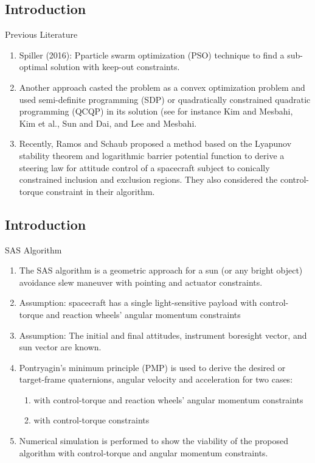 \documentclass{beamer}
\begin{document}
\begin{frame}
	\section{Introduction}
		\begin{block}{Previous Literature}
			\begin{enumerate}
				\item Spiller (2016): Pparticle swarm optimization (PSO) technique to find a sub-optimal solution with keep-out constraints. 
				\item Another approach casted the problem as a convex optimization problem and used semi-definite programming (SDP) or quadratically constrained quadratic programming (QCQP) in its solution (see for instance Kim and Mesbahi, Kim et al., Sun and Dai, and Lee and Mesbahi.
				\item Recently, Ramos and Schaub proposed a method based on the Lyapunov stability theorem and logarithmic barrier potential function to derive a steering law for attitude control of a spacecraft subject to conically constrained inclusion and exclusion regions. They also considered the control-torque constraint in their algorithm.  
		\end{enumerate}
	\end{block}
\end{frame}
\begin{frame}
\section{Introduction}
\begin{block}{SAS Algorithm}
	\begin{enumerate} 
		\item The SAS algorithm is a geometric approach for a sun (or any bright object) avoidance slew maneuver with pointing and actuator constraints. 
		\item Assumption: spacecraft has a single light-sensitive payload with control-torque and reaction wheels' angular momentum constraints
		\item Assumption: The initial and final attitudes, instrument boresight vector, and sun vector are known. 
		\item Pontryagin's minimum principle (PMP) is used to derive the desired or target-frame quaternions, angular velocity and acceleration for two cases: 
		\begin{enumerate}
			\item with control-torque and reaction wheels' angular momentum constraints
			\item with control-torque constraints
		\end{enumerate} 
		\item Numerical simulation is performed to show the viability of the proposed algorithm with control-torque and angular momentum constraints.
	\end{enumerate} 
\end{block}
\end{frame}
\end{document}
